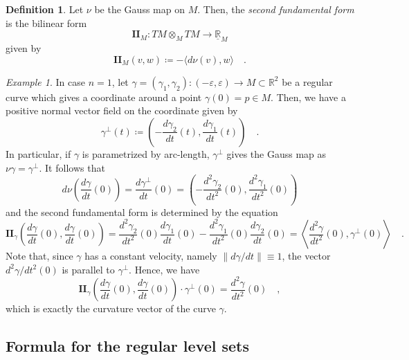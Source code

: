 \documentclass[pdftex,a4paper,12pt]{scrartcl}
\theoremstyle{plain}
\theoremstyle{definition}
\newtheorem{definition}{Definition}
\theoremstyle{remark}
\newtheorem{example}[theorem]{Example}
\numberwithin{equation}{section}
\begin{document}
\begin{definition}
Let $\nu$ be the Gauss map on $M$.
Then, the \emph{second fundamental form} is the bilinear form
\[
\mathbf{II}_M:TM\otimes_M TM\to\underline{\mathbb R}_M
\]
given by
\[
\mathbf{II}_M(v,w)
\coloneqq -\langle d\nu(v),w\rangle
\quad.
\]
\end{definition}

\begin{example}
In case $n=1$, let $\gamma=(\gamma_1,\gamma_2):(-\varepsilon,\varepsilon)\to M\subset\mathbb R^2$ be a regular curve which gives a coordinate around a point $\gamma(0)=p\in M$.
Then, we have a positive normal vector field on the coordinate given by
\[
\gamma^\perp(t)\coloneqq \left(-\frac{d\gamma_2}{dt}(t),\frac{d\gamma_1}{dt}(t)\right)
\quad.
\]
In particular, if $\gamma$ is parametrized by arc-length, $\gamma^\perp$ gives the Gauss map as $\nu\gamma=\gamma^\perp$.
It follows that
\[
d\nu\left(\frac{d\gamma}{dt}(0)\right)
= \frac{d\gamma^\perp}{dt}(0)
= \left(-\frac{d^2\gamma_2}{dt^2}(0),\frac{d^2\gamma_1}{dt^2}(0)\right)
\]
and the second fundamental form is determined by the equation
\[
\mathbf{II}_\gamma\left(\frac{d\gamma}{dt}(0),\frac{d\gamma}{dt}(0)\right)
= \frac{d^2\gamma_2}{dt^2}(0)\frac{d\gamma_1}{dt}(0) - \frac{d^2\gamma_1}{dt^2}(0)\frac{d\gamma_2}{dt}(0)
= \left\langle \frac{d^2\gamma}{dt^2}(0), \gamma^\perp(0)\right\rangle
\quad.
\]
Note that, since $\gamma$ has a constant velocity, namely $\|d\gamma/dt\|\equiv1$, the vector $d^2\gamma/dt^2(0)$ is parallel to $\gamma^\perp$.
Hence, we have
\[
\mathbf{II}_\gamma\left(\frac{d\gamma}{dt}(0),\frac{d\gamma}{dt}(0)\right)\cdot\gamma^\perp(0)
= \frac{d^2\gamma}{dt^2}(0)
\quad,
\]
which is exactly the curvature vector of the curve $\gamma$.
\end{example}

\subsection{Formula for the regular level sets}
\end{document}
